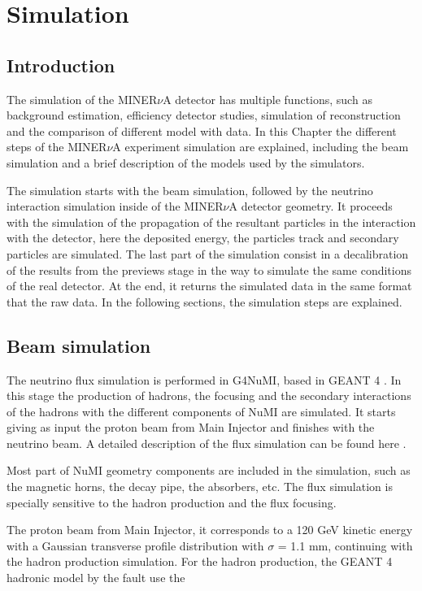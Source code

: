 \chapter{Simulation}
\minitoc
\label{Cap:Simulation}

\section{Introduction}
\label{Cap:Simulation:Introduction}
The simulation of the MINER$\nu$A detector has multiple functions, such as background estimation, efficiency detector studies, simulation of reconstruction and the comparison of different  model with data. In this Chapter the different steps of the MINER$\nu$A experiment simulation are explained, including the beam simulation and a brief description of the models used by the simulators.

The simulation starts with the beam simulation, followed by the neutrino interaction simulation inside of the MINER$\nu$A detector geometry. It proceeds with the simulation of the propagation of the resultant particles in the interaction with the detector, here the deposited energy, the particles track and secondary particles are simulated. The last part of the simulation consist in a decalibration of the results from the previews stage in the way to simulate the same conditions of the real detector. At the end, it returns the simulated data in the same format that the raw data. In the following sections, the simulation steps are explained.

\section{Beam simulation}
\label{Cap:Simulation:BeamSimulation}

The neutrino flux simulation is performed in G4NuMI, based in GEANT 4 \cite{GEANT4}. In this stage the production of hadrons, the focusing and the secondary interactions of the hadrons with the different components of NuMI are simulated. It starts giving as input the proton beam from Main Injector and finishes with the neutrino beam. A detailed description of the flux simulation can be found here \cite{LeoThesis}.

Most part of NuMI geometry components are included in the simulation, such as the magnetic horns, the decay pipe, the absorbers, etc. The flux simulation is specially sensitive to the hadron production and the flux focusing. 

The proton beam from Main Injector, it corresponds to a 120 GeV kinetic energy with a Gaussian transverse profile distribution with $\sigma$ = 1.1 mm, continuing with the hadron production simulation. For the hadron production, the GEANT 4 hadronic model by the fault use the  




